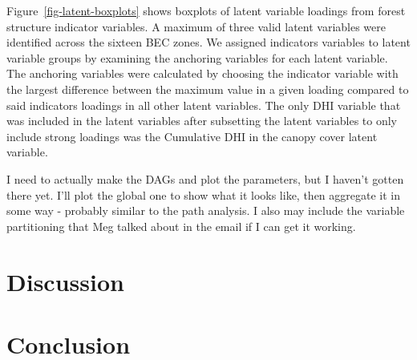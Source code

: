 \documentclass[
  authoryear,
  review,
  3p,
  twocolumn]{elsarticle}
\begin{document}
Figure~\ref{fig-latent-boxplots} shows boxplots of latent variable
loadings from forest structure indicator variables. A maximum of three
valid latent variables were identified across the sixteen BEC zones. We
assigned indicators variables to latent variable groups by examining the
anchoring variables for each latent variable. The anchoring variables
were calculated by choosing the indicator variable with the largest
difference between the maximum value in a given loading compared to said
indicators loadings in all other latent variables. The only DHI variable
that was included in the latent variables after subsetting the latent
variables to only include strong loadings was the Cumulative DHI in the
canopy cover latent variable.

I need to actually make the DAGs and plot the parameters, but I haven't
gotten there yet. I'll plot the global one to show what it looks like,
then aggregate it in some way - probably similar to the path analysis. I
also may include the variable partitioning that Meg talked about in the
email if I can get it working.

\hypertarget{discussion}{%
\section{Discussion}\label{discussion}}

\hypertarget{conclusion}{%
\section{Conclusion}\label{conclusion}}

\newpage


\renewcommand\refname{References}
  
\end{document}
